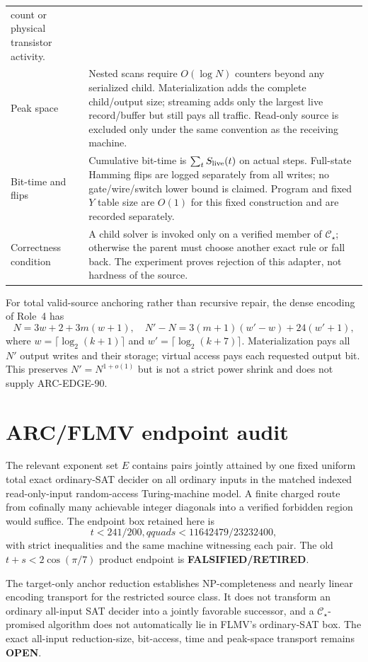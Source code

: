\documentclass[11pt]{article}
\newcommand{\Cstar}{\mathcal C_\star}
\newcommand{\OPEN}{\textbf{OPEN}}
\begin{document}
\begin{longtable}{@{}p{.15\linewidth}p{.78\linewidth}@{}}
count or physical transistor activity.\\
Peak space&Nested scans require $O(\log N)$ counters beyond any serialized child.
Materialization adds the complete child/output size; streaming adds only the
largest live record/buffer but still pays all traffic.  Read-only source is
excluded only under the same convention as the receiving machine.\\
Bit-time and flips&Cumulative bit-time is $\sum_t S_{\rm live}(t)$ on actual
steps.  Full-state Hamming flips are logged separately from all writes; no
gate/wire/switch lower bound is claimed.  Program and fixed $Y$ table size are
$O(1)$ for this fixed construction and are recorded separately.\\
Correctness condition&A child solver is invoked only on a verified member of
$\Cstar$; otherwise the parent must choose another exact rule or fall back.
The experiment proves rejection of this adapter, not hardness of the source.\\
\bottomrule
\end{longtable}

For total valid-source anchoring rather than recursive repair, the dense
encoding of Role~4 has
\[
N=3w+2+3m(w+1),\quad
N'-N=3(m+1)(w'-w)+24(w'+1),
\]
where $w=\lceil\log_2(k+1)\rceil$ and
$w'=\lceil\log_2(k+7)\rceil$.  Materialization pays all $N'$ output writes and
their storage; virtual access pays each requested output bit.  This preserves
$N'=N^{1+o(1)}$ but is not a strict power shrink and does not supply ARC-EDGE-90.

\section{ARC/FLMV endpoint audit}
The relevant exponent set $E$ contains pairs jointly attained by one fixed
uniform total exact ordinary-SAT decider on all ordinary inputs in the matched
indexed read-only-input random-access Turing-machine model.  A finite charged
route from cofinally many achievable integer diagonals into a verified
forbidden region would suffice.  The endpoint box retained here is
\[
 t<241/200,qquad s<11642479/23232400,
\]
with strict inequalities and the same machine witnessing each pair.  The old
$t+s<2\cos(\pi/7)$ product endpoint is \textbf{FALSIFIED/RETIRED}.

The target-only anchor reduction establishes NP-completeness and nearly linear
encoding transport for the restricted source class.  It does not transform an
ordinary all-input SAT decider into a jointly favorable successor, and a
$\Cstar$-promised algorithm does not automatically lie in FLMV's ordinary-SAT
box.  The exact all-input reduction-size, bit-access, time and peak-space
transport remains \OPEN.
\end{document}
